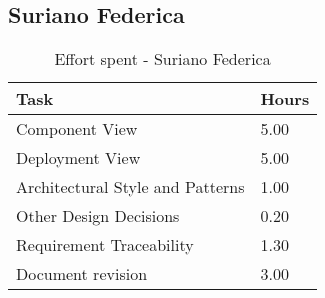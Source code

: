 \subsection{Suriano Federica}
\renewcommand{\arraystretch}{2}
\begin{longtable}{|m{9cm}|m{1.2cm}|}
\caption{Effort spent - Suriano Federica}\\
\hline
\endfirsthead
\endhead
\hline
\endlastfoot
\rowcolor{green2}
\textbf{Task} &\hfil {\textbf{Hours}}\\
\hline
Component View & \hfil 5.00 \\
Deployment View & \hfil 5.00\\
Architectural Style and Patterns & \hfil 1.00\\
Other Design Decisions & \hfil 0.20\\
Requirement Traceability  & \hfil 1.30\\
Document revision & \hfil 3.00\\
\hline
\end{longtable}
